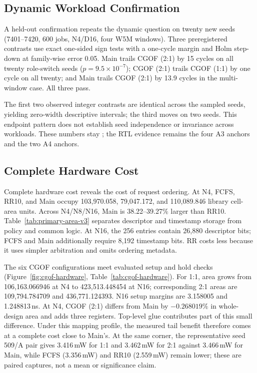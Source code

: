 \subsection{Dynamic Workload Confirmation}

A held-out confirmation repeats the dynamic question on twenty new seeds (7401--7420, 600  jobs, N4/D16, four W5M windows). Three preregistered contrasts use exact one-sided sign tests with a one-cycle margin and Holm step-down at family-wise error 0.05. Main trails CGOF (2:1) by 15 cycles on all twenty role-switch seeds ($p=9.5\times10^{-7}$); CGOF (2:1) trails CGOF (1:1) by one cycle on all twenty; and Main trails CGOF (2:1) by 13.9 cycles in the multi-window case. All three pass.

The first two observed integer contrasts are identical across the sampled seeds, yielding zero-width descriptive intervals; the third moves on two seeds. This endpoint pattern does not establish seed independence or invariance across workloads. These numbers stay ; the RTL evidence remains the four A3 anchors and the two A4 anchors.

\subsection{Complete Hardware Cost}

Complete hardware cost reveals the cost of request ordering. At N4, FCFS, RR10, and Main occupy 103,970.058, 79,047.172, and 110,089.846 library cell-area units. Across N4/N8/N16, Main is 38.22--39.27\% larger than RR10. Table~\ref{tab:primary-area-v3} separates descriptor and timestamp storage from policy and common logic. At N16, the 256 entries contain 26,880 descriptor bits; FCFS and Main additionally require 8,192 timestamp bits. RR costs less because it uses simpler arbitration and omits ordering metadata.

The six CGOF configurations meet evaluated setup and hold checks (Figure~\ref{fig:cgof-hardware}, Table~\ref{tab:cgof-hardware}). For 1:1, area grows from 106,163.066946 at N4 to 423,513.448454 at N16; corresponding 2:1 areas are 109,794.784709 and 436,771.124393. N16 setup margins are 3.158005 and 1.248813\,ns. At N4, CGOF (2:1) differs from Main by $-0.268019\%$ in whole-design area and adds three registers. Top-level glue contributes part of this small difference. Under this mapping profile, the measured tail benefit therefore comes at a complete cost close to Main's. At the same corner, the representative seed 509/A pair gives 3.416\,mW for 1:1 and 3.462\,mW for 2:1 against 3.466\,mW for Main, while FCFS (3.356\,mW) and RR10 (2.559\,mW) remain lower; these are paired captures, not a mean or significance claim.

